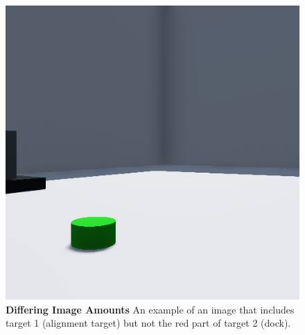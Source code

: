 \begin{figure}[htbp]
    \centering
    \includegraphics[width=0.7\columnwidth]{figures/src/target_1_but_not_target_2.png}
    \caption{
	    \textbf{Differing Image Amounts} An example of an image that includes target 1 (alignment target) but not the red part of target 2 (dock).
    }
    \label{fig:target_1_but_not_target_2}
\end{figure}
